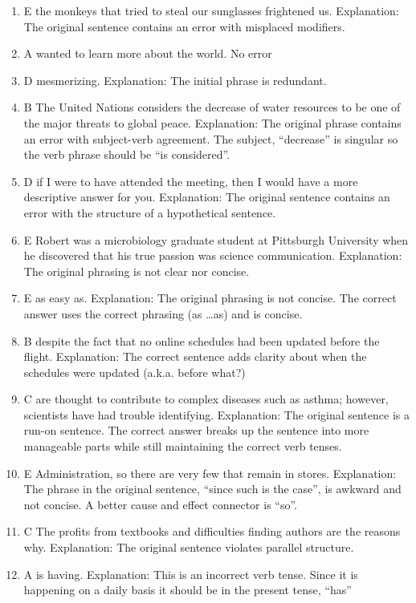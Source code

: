\begin{enumerate}
\item E the monkeys that tried to steal our sunglasses frightened us. Explanation: The original sentence contains an error with misplaced modifiers. 
\item A wanted to learn more about the world. No error
\item D mesmerizing. Explanation: The initial phrase is redundant. 
\item B The United Nations considers the decrease of water resources to be one of the major threats to global peace. Explanation: The original phrase contains an error with subject-verb agreement. The subject, ``decrease'' is singular so the verb phrase should be ``is considered''. 
\item D  if I were to have attended the meeting, then I would have a more descriptive answer for you. Explanation: The original sentence contains an error with the structure of a hypothetical sentence. 
\item E Robert was a microbiology graduate student at Pittsburgh University when he discovered that his true passion was science communication. Explanation: The original phrasing is not clear nor concise. 
\item E as easy as. Explanation: The original phrasing is not concise. The correct answer uses the correct phrasing (as \ldots as) and is concise. 
\item B despite the fact that no online schedules had been updated before the flight. Explanation: The correct sentence adds clarity about when the schedules were updated (a.k.a. before what?)
\item C are thought to contribute to complex diseases such as asthma; however, scientists have had trouble identifying. Explanation: The original sentence is a run-on sentence. The correct answer breaks up the sentence into more manageable parts while still maintaining the correct verb tenses. 
\item E Administration, so there are very few that remain in stores. Explanation: The phrase in the original sentence, ``since such is the case'', is awkward and not concise. A better cause and effect connector is ``so''. 
\item C The profits from textbooks and difficulties finding authors are the reasons why. Explanation: The original sentence violates parallel structure.
\item A is having. Explanation: This is an incorrect verb tense. Since it is happening on a daily basis it should be in the present tense, ``has''

\end{enumerate}
